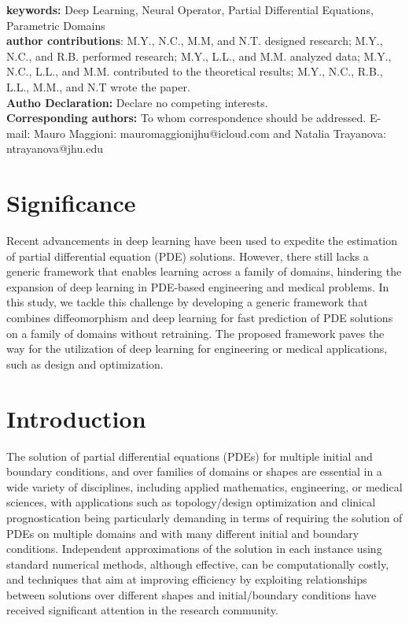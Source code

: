 \documentclass[review]{elsarticle}
\begin{document}
\textbf{keywords:} Deep Learning, Neural Operator, Partial Differential Equations, Parametric Domains\\
\textbf{author contributions}: M.Y., N.C., M.M, and N.T. designed research; M.Y., N.C., and R.B. performed research; M.Y., L.L., and M.M. analyzed data; M.Y., N.C., L.L., and M.M. contributed to the theoretical results; M.Y., N.C., R.B., L.L., M.M., and N.T wrote the paper.\\
\textbf{Autho Declaration:} Declare no competing interests.\\
\textbf{Corresponding authors:} To whom correspondence should be addressed. E-mail: Mauro Maggioni: mauromaggionijhu@icloud.com and Natalia Trayanova: ntrayanova@jhu.edu

\newpage

\section{Significance} \label{sec:sig}

Recent advancements in deep learning have been used to expedite the estimation of partial differential equation (PDE) solutions. However, there still lacks a generic framework that enables learning across a family of domains, hindering the expansion of deep learning in PDE-based engineering and medical problems. In this study, we tackle this challenge by developing a generic framework that combines diffeomorphism and deep learning for fast prediction of PDE solutions on a family of domains without retraining. The proposed framework paves the way for the utilization of deep learning for engineering or medical applications, such as design and optimization.

\section{Introduction}\label{sec:intro}

The solution of partial differential equations (PDEs) for multiple initial and boundary conditions, and over families of domains or shapes are essential in a wide variety of disciplines, including applied mathematics, engineering, or medical sciences, with applications such as topology/design optimization and clinical prognostication being particularly demanding in terms of requiring the solution of PDEs on multiple domains and with many different initial and boundary conditions. Independent approximations of the solution in each instance using standard numerical methods, although effective, can be computationally costly, and techniques that aim at improving efficiency by exploiting relationships between solutions over different shapes and initial/boundary conditions have received significant attention in the research community.
\end{document}
